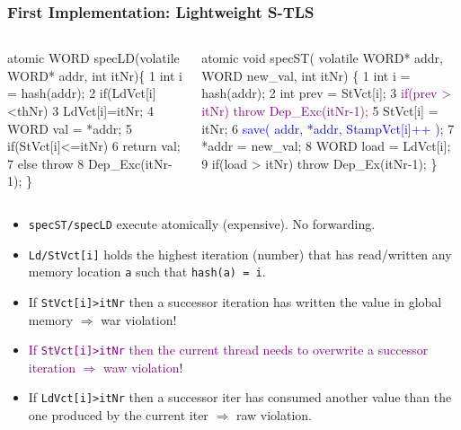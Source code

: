 \documentclass{beamer}
\newcommand{\blue}[1]{\textcolor{Blue}{{#1}}}
\newcommand{\purple}[1]{\textcolor{Purple}{{#1}}}
\newcommand{\emp}[1]{\textcolor{DikuRed}{ #1}}
\newcommand{\emphh}[1]{\textcolor{CosGreen}{ #1}}
\begin{document}
\begin{frame}[fragile,t]
  \frametitle{First Implementation: Lightweight S-TLS}

\begin{columns}
\begin{colorcode}
\emp{atomic} WORD \emphh{specLD}(volatile
      WORD* addr, int itNr)\{
1   int i = hash(addr);
2   \emphh{if(LdVct[i]<thNr)}
3      \emphh{LdVct[i]=itNr;}
4   WORD val = *addr;
5   if(StVct[i]<=itNr)
6      return val;
7   \emp{else throw}
8     \emp{Dep_Exc(itNr-1);}    \}
\end{colorcode}
\begin{colorcode}
\emp{atomic} void \emphh{specST}( volatile WORD* addr,
                    WORD new_val, int itNr) \{
1   int i    = hash(addr);
2   int prev = StVct[i];
3   \purple{if(prev > itNr) throw Dep_Exc(itNr-1);}
5   \emphh{StVct[i] = itNr;}
6   \blue{save( addr, *addr, StampVct[i]++ );}
7   *addr     = new_val;
8   WORD load = LdVct[i];
9   \alert{if(load > itNr) throw Dep_Ex(itNr-1);}  \}
\end{colorcode}
\end{columns}
\medskip\pause

\begin{itemize}
    \item {\tt specST/specLD} execute atomically (expensive). No forwarding.
    \item \emphh{{\tt Ld/StVct[i]} holds the highest iteration (number) that
            has read/written any memory location {\tt a} such that {\tt hash(a) = i}.}
    \item \emp{If {\tt StVct[i]>itNr} then a successor iteration has written the
                value in global memory $\Rightarrow$ {\sc war} violation}!
    \item \purple{If {\tt StVct[i]>itNr} then the current thread needs to overwrite
                a successor iteration $\Rightarrow$ {\sc waw} violation}!
    \item \alert{If {\tt LdVct[i]>itNr} then a successor iter has consumed
                another value than the one produced by the current iter $\Rightarrow$ {\sc raw} violation.}
\end{itemize}

\end{frame}
\end{document}
